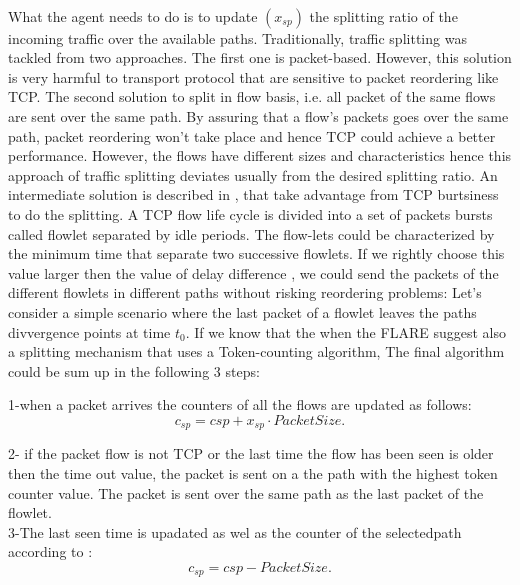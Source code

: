 \\ What the agent needs to do is to update $(x_{sp})$ the splitting ratio of the incoming traffic over the available paths. Traditionally, traffic splitting was tackled from two approaches. The first one is packet-based. However, this solution is very harmful to transport protocol that are sensitive to packet reordering like TCP. The second solution to split in flow basis, i.e. all packet of the same flows are sent over the same path. By assuring that a flow's packets goes over the same path, packet reordering won't take place and hence TCP could achieve a better performance. However, the flows have different sizes and characteristics hence this approach of traffic splitting deviates usually from the desired splitting ratio. An intermediate solution is described in \cite {sin1}, that take advantage from TCP burtsiness to do the splitting. A TCP flow life cycle is divided into a set of packets bursts called flowlet separated by idle periods. The flow-lets could be characterized by the minimum time that separate two successive flowlets. If we rightly choose this value larger then the value of delay difference , we could send the packets of the different flowlets in different paths without risking reordering problems: Let's consider a simple scenario where the last packet of a flowlet leaves the paths divvergence points at time $t_0$. If we know that the when the 
FLARE suggest also a splitting mechanism that uses a Token-counting algorithm, 
The final algorithm could be sum up in the following 3 steps:

1-when a packet arrives the counters of all the flows are updated as follows:
\begin{equation}
c_{sp} = c{sp} + x_{sp} \cdot PacketSize.
\end{equation}

2- if the packet flow is not TCP or the last time the flow has been seen is older then the time out value, the packet is sent on a the path with the highest token counter value. The packet is sent over the same path as the last packet of the flowlet.\\

3-The last seen time is upadated as wel as the counter of the selectedpath according to :
\begin{equation}
c_{sp} = c{sp} - PacketSize.
\end{equation}
